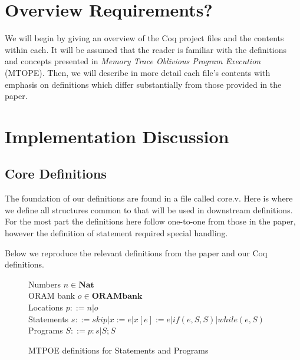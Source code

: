 \documentclass[10pt,  onecolumn]{article}
\begin{document}
\section {Overview Requirements?}
\label{sec:requirements}

We will begin by giving an overview of the Coq project files and the contents within each.
It will be assumed that the reader is familiar with the definitions and concepts presented in \emph{Memory Trace Oblivious Program Execution} (MTOPE).
Then, we will describe in more detail each file's contents with emphasis on definitions which differ substantially from those provided in the paper.


\section{ Implementation Discussion }
\label{sec:discussion}



	\subsection{ Core Definitions }
	The foundation of our definitions are found in a file called core.v.
	Here is where we define all structures common to that will be used in downstream definitions.
	For the most part the definitions here follow one-to-one from those in the paper, however the definition of statement required special handling.

	Below we reproduce the relevant definitions from the paper and our Coq definitions.


\begin{figure}
\caption{ MTPOE definitions for Statements and Programs }
\label{fig:mto_rule_while}

	\begin{mdframed}
	Numbers $n \in \textbf{Nat}$\\
	ORAM bank $o \in \textbf{ORAMbank}$\\
	Locations $p ::= n | o$\\
	Statements $ s ::= skip | x := e | x[e] := e | if(e, S, S) | while(e, S)$\\
	Programs $ S ::= p:s | S;S$
	\end{mdframed}

\end{figure}
\end{document}
